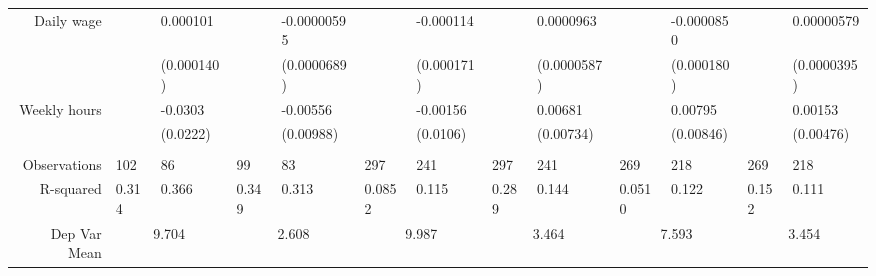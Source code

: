 \begin{tabular}{rrrrrrrrrrrrr}
Daily wage & \multicolumn{1}{l}{} & \multicolumn{1}{l}{0.000101} & \multicolumn{1}{l}{} & \multicolumn{1}{l}{-0.00000595} & \multicolumn{1}{l}{} & \multicolumn{1}{l}{-0.000114} & \multicolumn{1}{l}{} & \multicolumn{1}{l}{0.0000963} & \multicolumn{1}{l}{} & \multicolumn{1}{l}{-0.0000850} & \multicolumn{1}{l}{} & \multicolumn{1}{l}{0.00000579} \\
      & \multicolumn{1}{l}{} & \multicolumn{1}{l}{(0.000140)} & \multicolumn{1}{l}{} & \multicolumn{1}{l}{(0.0000689)} & \multicolumn{1}{l}{} & \multicolumn{1}{l}{(0.000171)} & \multicolumn{1}{l}{} & \multicolumn{1}{l}{(0.0000587)} & \multicolumn{1}{l}{} & \multicolumn{1}{l}{(0.000180)} & \multicolumn{1}{l}{} & \multicolumn{1}{l}{(0.0000395)} \\
Weekly hours & \multicolumn{1}{l}{} & \multicolumn{1}{l}{-0.0303} & \multicolumn{1}{l}{} & \multicolumn{1}{l}{-0.00556} & \multicolumn{1}{l}{} & \multicolumn{1}{l}{-0.00156} & \multicolumn{1}{l}{} & \multicolumn{1}{l}{0.00681} & \multicolumn{1}{l}{} & \multicolumn{1}{l}{0.00795} & \multicolumn{1}{l}{} & \multicolumn{1}{l}{0.00153} \\
      & \multicolumn{1}{l}{} & \multicolumn{1}{l}{(0.0222)} & \multicolumn{1}{l}{} & \multicolumn{1}{l}{(0.00988)} & \multicolumn{1}{l}{} & \multicolumn{1}{l}{(0.0106)} & \multicolumn{1}{l}{} & \multicolumn{1}{l}{(0.00734)} & \multicolumn{1}{l}{} & \multicolumn{1}{l}{(0.00846)} & \multicolumn{1}{l}{} & \multicolumn{1}{l}{(0.00476)} \\
      & \multicolumn{1}{l}{} & \multicolumn{1}{l}{} & \multicolumn{1}{l}{} & \multicolumn{1}{l}{} & \multicolumn{1}{l}{} & \multicolumn{1}{l}{} & \multicolumn{1}{l}{} & \multicolumn{1}{l}{} & \multicolumn{1}{l}{} & \multicolumn{1}{l}{} & \multicolumn{1}{l}{} & \multicolumn{1}{l}{} \\
      \midrule
Observations & \multicolumn{1}{l}{102} & \multicolumn{1}{l}{86} & \multicolumn{1}{l}{99} & \multicolumn{1}{l}{83} & \multicolumn{1}{l}{297} & \multicolumn{1}{l}{241} & \multicolumn{1}{l}{297} & \multicolumn{1}{l}{241} & \multicolumn{1}{l}{269} & \multicolumn{1}{l}{218} & \multicolumn{1}{l}{269} & \multicolumn{1}{l}{218} \\
R-squared & \multicolumn{1}{l}{0.314} & \multicolumn{1}{l}{0.366} & \multicolumn{1}{l}{0.349} & \multicolumn{1}{l}{0.313} & \multicolumn{1}{l}{0.0852} & \multicolumn{1}{l}{0.115} & \multicolumn{1}{l}{0.289} & \multicolumn{1}{l}{0.144} & \multicolumn{1}{l}{0.0510} & \multicolumn{1}{l}{0.122} & \multicolumn{1}{l}{0.152} & \multicolumn{1}{l}{0.111} \\
Dep Var Mean & \multicolumn{2}{c}{9.704} & \multicolumn{2}{c}{2.608} & \multicolumn{2}{c}{9.987} & \multicolumn{2}{c}{3.464} & \multicolumn{2}{c}{7.593} & \multicolumn{2}{c}{3.454} \\
\bottomrule
\end{tabular}%
